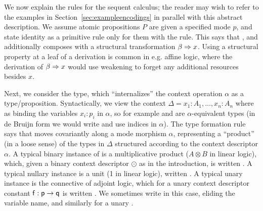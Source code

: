 
We now explain the rules for the sequent calculus; the reader may wish
to refer to the examples in Section~\ref{sec:exampleencodings} in
parallel with this abstract description.  We assume atomic propositions
$P$ are given a specified mode $p$, and state identity as a primitive
rule only for them with the  rule.  This says that
, and additionally composes with a structural
transformation $\beta \Rightarrow x$.  Using a structural property at a leaf of
a derivation is common in e.g. affine logic, where the derivation of
$\beta \Rightarrow x$ would use weakening to forget any additional resources
besides $x$.

Next, we consider the \F{\alpha}{\Delta} type, which ``internalizes''
the context operation $\alpha$ as a type/proposition.  Syntactically, we
view the context $\Delta = x_1:A_1,\ldots,x_n:A_n$ where
 as binding the variables $x_i:p_i$ in $\alpha$, so for
example  and  are $\alpha$-equivalent types (in de Bruijn form we
would write  and use indices in $\alpha$).
The type formation rule says that  moves covariantly along a mode
morphism $\alpha$, representing a ``product'' (in a loose sense) of the
types in $\Delta$ structured according to the context descriptor
$\alpha$. A typical binary instance of  is a multiplicative
product ($A \otimes B$ in linear logic), which, given a binary context
descriptor $\odot$ as in the introduction, is written .  A typical nullary instance is a unit (1 in linear
logic), written .  A typical unary instance is the 
connective of adjoint logic, which for a unary context descriptor
constant $\mathsf{f} : \mathsf{p} \to \mathsf{q}$ is written .
We sometimes write  in this case, eliding the variable
name, and similarly for a unary .

